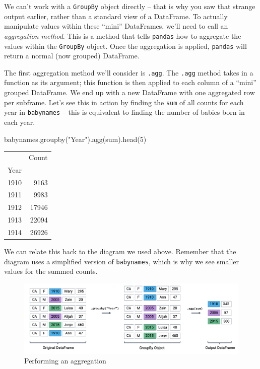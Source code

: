 \documentclass[
  letterpaper,
  DIV=11,
  numbers=noendperiod]{scrreprt}
\newenvironment{Shaded}{\begin{snugshade}}{\end{snugshade}}
\newcommand{\BuiltInTok}[1]{\textcolor[rgb]{0.00,0.23,0.31}{#1}}
\newcommand{\DecValTok}[1]{\textcolor[rgb]{0.68,0.00,0.00}{#1}}
\newcommand{\NormalTok}[1]{\textcolor[rgb]{0.00,0.23,0.31}{#1}}
\newcommand{\StringTok}[1]{\textcolor[rgb]{0.13,0.47,0.30}{#1}}
\begin{document}
We can't work with a \texttt{GroupBy} object directly -- that is why you
saw that strange output earlier, rather than a standard view of a
DataFrame. To actually manipulate values within these ``mini''
DataFrames, we'll need to call an \emph{aggregation method}. This is a
method that tells \texttt{pandas} how to aggregate the values within the
\texttt{GroupBy} object. Once the aggregation is applied,
\texttt{pandas} will return a normal (now grouped) DataFrame.

The first aggregation method we'll consider is \texttt{.agg}. The
\texttt{.agg} method takes in a function as its argument; this function
is then applied to each column of a ``mini'' grouped DataFrame. We end
up with a new DataFrame with one aggregated row per subframe. Let's see
this in action by finding the \texttt{sum} of all counts for each year
in \texttt{babynames} -- this is equivalent to finding the number of
babies born in each year.

\begin{Shaded}
\begin{Highlighting}[]
\NormalTok{babynames.groupby(}\StringTok{"Year"}\NormalTok{).agg(}\BuiltInTok{sum}\NormalTok{).head(}\DecValTok{5}\NormalTok{)}
\end{Highlighting}
\end{Shaded}

\begin{tabular}{lr}
\toprule
{} &  Count \\
Year &        \\
\midrule
1910 &   9163 \\
1911 &   9983 \\
1912 &  17946 \\
1913 &  22094 \\
1914 &  26926 \\
\bottomrule
\end{tabular}

We can relate this back to the diagram we used above. Remember that the
diagram uses a simplified version of \texttt{babynames}, which is why we
see smaller values for the summed counts.

\begin{figure}

{\centering \includegraphics{pandas_2/images/agg.png}

}

\caption{Performing an aggregation}

\end{figure}
\end{document}
